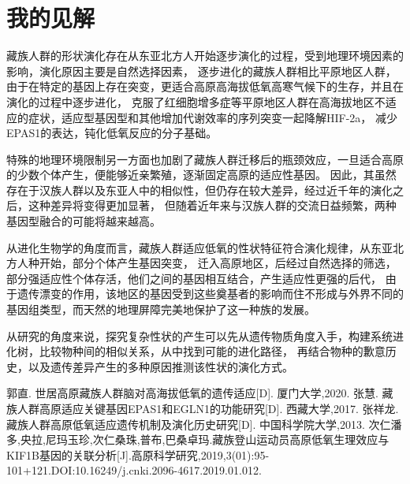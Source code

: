\documentclass[UTF8]{article}
\begin{document}
    \section{我的见解}
    藏族人群的形状演化存在从东亚北方人开始逐步演化的过程，受到地理环境因素的影响，演化原因主要是自然选择因素，
    逐步进化的藏族人群相比平原地区人群，由于在特定的基因上存在突变，更适合高原高海拔低氧高寒气候下的生存，并且在演化的过程中逐步进化，
    克服了红细胞增多症等平原地区人群在高海拔地区不适应的症状，适应型基因型和其他增加代谢效率的序列突变一起降解HIF-2a，
    减少EPAS1的表达，钝化低氧反应的分子基础。

    特殊的地理环境限制另一方面也加剧了藏族人群迁移后的瓶颈效应，一旦适合高原的少数个体产生，便能够近亲繁殖，逐渐固定高原的适应性基因。
    因此，其虽然存在于汉族人群以及东亚人中的相似性，但仍存在较大差异，经过近千年的演化之后，这种差异将变得更加显著，
    但随着近年来与汉族人群的交流日益频繁，两种基因型融合的可能将越来越高。

    从进化生物学的角度而言，藏族人群适应低氧的性状特征符合演化规律，从东亚北方人种开始，部分个体产生基因突变，
    迁入高原地区，后经过自然选择的筛选，部分强适应性个体存活，他们之间的基因相互结合，产生适应性更强的后代，
    由于遗传漂变的作用，该地区的基因受到这些奠基者的影响而住不形成与外界不同的基因组类型，而天然的地理屏障完美地保护了这一种族的发展。

    从研究的角度来说，探究复杂性状的产生可以先从遗传物质角度入手，构建系统进化树，比较物种间的相似关系，从中找到可能的进化路径，
    再结合物种的歉意历史，以及遗传差异产生的多种原因推测该性状的演化方式。

    \begin{thebibliography}{99}  
        郭直. 世居高原藏族人群脑对高海拔低氧的遗传适应[D]. 厦门大学,2020.
        张慧. 藏族人群高原适应关键基因EPAS1和EGLN1的功能研究[D]. 西藏大学,2017.
        张祥龙. 藏族人群高原低氧适应遗传机制及演化历史研究[D]. 中国科学院大学,2013.
        次仁潘多,央拉,尼玛玉珍,次仁桑珠,普布,巴桑卓玛.藏族登山运动员高原低氧生理效应与KIF1B基因的关联分析[J].高原科学研究,2019,3(01):95-101+121.DOI:10.16249/j.cnki.2096-4617.2019.01.012.
    \end{thebibliography}
\end{document}
